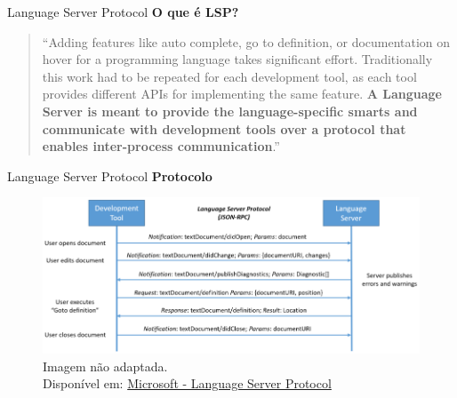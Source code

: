\begin{frame}{Language Server Protocol}
    \textbf{O que é LSP?}
    \begin{quotation} \small
      ``Adding features like auto complete, go to definition, or documentation on hover for a programming language takes
      significant effort. Traditionally this work had to be repeated for each development tool, as each tool provides
      different APIs for implementing the same feature. \textbf{A Language Server is meant to provide the language-specific
      smarts and communicate with development tools over a protocol that enables inter-process
      communication}\cite{microsoftLSP}.''
    \end{quotation}
\end{frame}

\begin{frame}{Language Server Protocol}
  \textbf{Protocolo}
  \begin{figure}
      \centering
      \includegraphics[height=0.3\linewidth]{Image/LSP-Diagram.png}
      \label{lsp-diagram}
      \footnotesize
      \\ Imagem não adaptada. \\
      Disponível em: \hyperlink{https://microsoft.github.io/language-server-protocol/overviews/lsp/overview/}{Microsoft - Language Server Protocol}
  \end{figure}
\end{frame}

